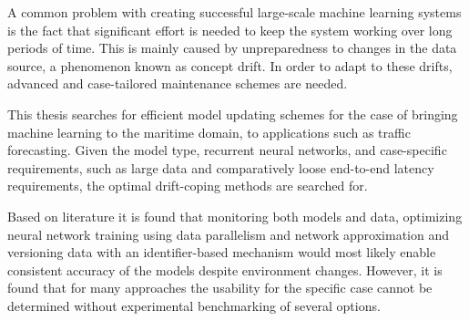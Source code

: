 
A common problem with creating successful large-scale machine learning systems is the fact that significant effort is needed to keep the system working over long periods of time. This is mainly caused by unpreparedness to changes in the data source, a phenomenon known as concept drift. In order to adapt to these drifts, advanced and case-tailored maintenance schemes are needed.

This thesis searches for efficient model updating schemes for the case of bringing machine learning to the maritime domain, to applications such as traffic forecasting. Given the model type, recurrent neural networks, and case-specific requirements, such as large data and comparatively loose end-to-end latency requirements, the optimal drift-coping methods are searched for.

Based on literature it is found that monitoring  both models and data, optimizing neural network training using data parallelism and network approximation and versioning data with an   identifier-based mechanism would most likely enable consistent accuracy of the models despite environment changes. However, it is found that for many approaches the usability for the specific case cannot be determined without experimental benchmarking of several options.  %

  
